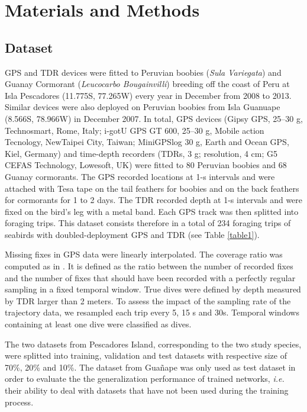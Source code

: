 \documentclass{article}
\begin{document}
\section{Materials and Methods}
\subsection{Dataset}

GPS and TDR devices were fitted to Peruvian boobies (\textit{Sula Variegata}) and Guanay Cormorant
(\textit{Leucocarbo Bougainvilli}) breeding off the coast of Peru at Isla Pescadores (11.775\degree S, 77.265\degree W) every year in December from 2008 to 2013. Similar devices were also deployed on Peruvian boobies from Isla Guanuape (8.566\degree S, 78.966\degree W) in December 2007.
In total, GPS devices (Gipsy GPS, 25–30 g, Technosmart, Rome, Italy; i-gotU GPS GT 600, 25–30 g, Mobile action Tecnology, NewTaipei City, Taiwan; MiniGPSlog 30 g, Earth and Ocean GPS, Kiel, Germany) and time-depth recorders (TDRs, 3 g; resolution, 4 cm; G5
CEFAS Technology, Lowesoft, UK) were fitted to 80 Peruvian boobies and 68 Guanay cormorants. The GPS recorded locations at 1-s intervals and were attached with Tesa tape on the tail feathers for boobies and on the back feathers for cormorants for 1 to 2 days. The TDR recorded depth at 1-s intervals and were fixed on the bird's leg with a metal band. Each GPS track was then splitted into foraging trips. This dataset consists therefore in a total of 234 foraging trips of seabirds with doubled-deployment GPS and TDR (see Table \ref{table1}).

Missing fixes in GPS data were linearly interpolated.
The coverage ratio was computed as in \cite{browning_predicting_2018}.
It is defined as the ratio between the number of recorded fixes and the number of fixes that should have been recorded with a perfectly regular sampling in a fixed temporal window.
True dives were defined by depth measured by TDR larger than 2 meters. To assess the impact of the sampling rate of the trajectory data, we resampled each trip every 5, 15 s and 30s. Temporal windows containing at least one dive were classified as dives.

The two datasets from Pescadores Island, corresponding to the two study species,  were splitted into training, validation and test datasets with respective size of 70\%, 20\% and 10\%. The dataset from Guañape was only used as test dataset in order to evaluate the the generalization performance of trained networks, {\em i.e.} their ability to deal with datasets that have not been used during the training process.
\end{document}
